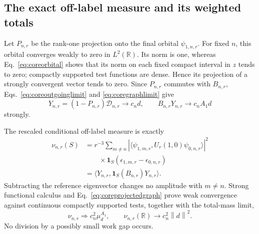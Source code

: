 \documentclass[aps,pra,reprint,superscriptaddress,longbibliography]{revtex4-2}
\newcommand{\R}{\mathbb R}
\newcommand{\norm}[1]{\left\lVert#1\right\rVert}
\begin{document}
\subsection{The exact off-label measure and its weighted totals}

Let $P_{n,r}$ be the rank-one projection onto the final orbital
$\psi_{1,n,r}$. For fixed $n$, this orbital converges weakly to zero in
$L^2(\R)$. Its norm is one, whereas Eq.~\eqref{eq:coreorbital} shows
that its norm on each fixed compact interval in $z$ tends to zero;
compactly supported test functions are dense. Hence its projection of a
strongly convergent vector tends to zero. Since $P_{n,r}$ commutes with
$B_{n,r}$, Eqs.~\eqref{eq:coreoutgoinglimit} and
\eqref{eq:coregraphlimit} give
\begin{equation}
 Y_{n,r}=(1-P_{n,r})\mathcal D_{n,r}\to c_nd,
 \qquad B_{n,r}Y_{n,r}\to c_nA_1d
 \label{eq:coreprojectedgraph}
\end{equation}
strongly.

The rescaled conditional off-label measure is exactly
\begin{align}
 \nu_{n,r}(S)
 &=r^{-3}\sum_{m\ne n}
   |\langle\psi_{1,m,r},U_r(1,0)\psi_{0,n,r}\rangle|^2\nonumber\\
 &\qquad\times\mathbf1_S(\epsilon_{1,m,r}-\epsilon_{0,n,r})\nonumber\\
 &=\langle Y_{n,r},\mathbf1_S(B_{n,r})Y_{n,r}\rangle.
 \label{eq:coreexactmeasure}
\end{align}
Subtracting the reference eigenvector changes no amplitude with $m\ne n$.
Strong functional calculus and Eq.~\eqref{eq:coreprojectedgraph} prove
weak convergence against continuous compactly supported tests, together
with the total-mass limit,
\begin{equation}
 \nu_{n,r}\Longrightarrow c_n^2\mu_d^{A_1},\qquad
 \nu_{n,r}(\R)\to c_n^2\norm d^2.
 \label{eq:corefixedlabelmeasure}
\end{equation}
No division by a possibly small work gap occurs.
\end{document}
